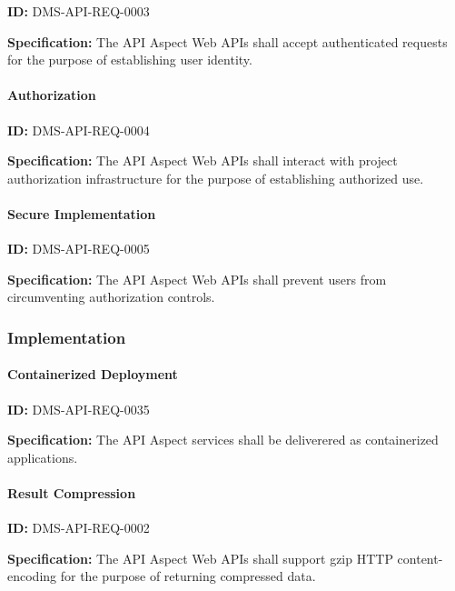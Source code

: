 \documentclass[SE,toc]{lsstdoc}
\begin{document}
\label{DMS-API-REQ-0003}
\textbf{ID:} DMS-API-REQ-0003

\textbf{Specification:}
The API Aspect Web APIs shall accept authenticated requests for the purpose of establishing user identity.

\paragraph{Authorization}\hfill  %

\label{DMS-API-REQ-0004}
\textbf{ID:} DMS-API-REQ-0004

\textbf{Specification:}
The API Aspect Web APIs shall interact with project authorization infrastructure for the purpose of establishing authorized use.

\paragraph{Secure Implementation}\hfill  %

\label{DMS-API-REQ-0005}
\textbf{ID:} DMS-API-REQ-0005

\textbf{Specification:}
The API Aspect Web APIs shall prevent users from circumventing authorization controls.

\subsubsection{Implementation}

\paragraph{Containerized Deployment}\hfill  %

\label{DMS-API-REQ-0035}
\textbf{ID:} DMS-API-REQ-0035

\textbf{Specification:}
The API Aspect services shall be deliverered as containerized applications.

\paragraph{Result Compression}\hfill  %

\label{DMS-API-REQ-0002}
\textbf{ID:} DMS-API-REQ-0002

\textbf{Specification:}
The API Aspect Web APIs shall support gzip HTTP content-encoding for the purpose of returning compressed data.
\end{document}
